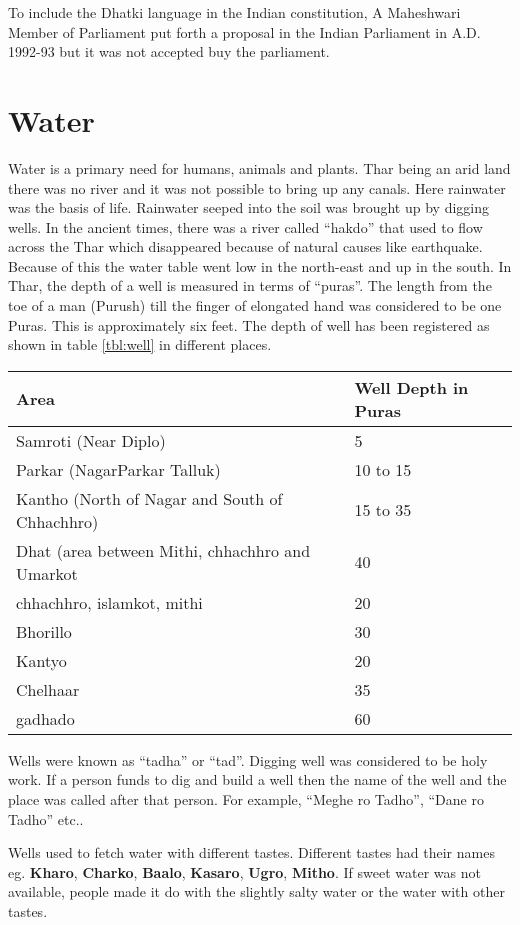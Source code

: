 To include the Dhatki language in the Indian constitution, A Maheshwari Member of Parliament put forth a proposal in the Indian Parliament in A.D. 1992-93 but it was not accepted buy the parliament.

\section{Water}
Water is a primary need for humans, animals and plants. Thar being an arid land there was no river and it was not possible to bring up any canals. Here rainwater was the basis of life. Rainwater seeped into the soil was brought up by digging wells. In the ancient times, there was a river called ``hakdo'' that used to flow across the Thar which disappeared because of natural causes like earthquake. Because of this the water table went low in the north-east and up in the south. In Thar, the depth of a well is measured in terms of ``puras''. The length from the toe of a man (Purush) till the finger of elongated hand was considered to be one Puras. This is approximately six feet. The depth of well has been registered as shown in table \ref{tbl:well} in different places.
\begin{center}
\begin{tabular}{l|l}
\hline
\textbf{Area} & \textbf{Well Depth in Puras} \\
\hline
Samroti (Near Diplo) & 5 \\ 
Parkar (NagarParkar Talluk) & 10 to 15 \\ 
Kantho (North of Nagar and South of Chhachhro) & 15 to 35 \\ 
Dhat (area between Mithi, chhachhro and Umarkot & 40 \\ 
chhachhro, islamkot, mithi & 20 \\ 
Bhorillo & 30 \\ 
Kantyo & 20 \\ 
Chelhaar & 35 \\ 
gadhado & 60 \\ 
\hline
\end{tabular}
\end{center}
Wells were known as ``tadha'' or ``tad''. Digging well was considered to be holy work. If a person funds to dig and build a well then the name of the well and the place was called after that person. For example, ``Meghe ro Tadho'', ``Dane ro Tadho'' etc..

Wells used to fetch water with different tastes. Different tastes had their names eg. \textbf{Kharo}, \textbf{Charko}, \textbf{Baalo}, \textbf{Kasaro}, \textbf{Ugro}, \textbf{Mitho}. If sweet water was not available, people made it do with the slightly salty water or the water with other tastes.

